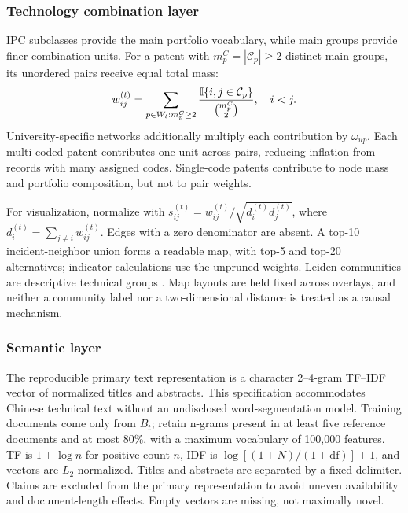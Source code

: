 \subsubsection{Technology combination layer}
IPC subclasses provide the main portfolio vocabulary, while main groups provide
finer combination units. For a patent with $m_p^{C}=|\mathcal{C}_p|\geq2$ distinct
main groups, its unordered pairs receive equal total mass:
\begin{equation}
 w_{ij}^{(t)}=\sum_{p\in W_t:m_p^C\geq2}
 \frac{\mathbb{I}\{i,j\in\mathcal{C}_p\}}{\binom{m_p^C}{2}},\quad i<j.
 \label{eq:cooc}
\end{equation}
University-specific networks additionally multiply each contribution by
$\omega_{up}$. Each multi-coded patent contributes one unit across pairs, reducing
inflation from records with many assigned codes. Single-code patents contribute
to node mass and portfolio composition, but not to pair weights.

For visualization, normalize with
$s_{ij}^{(t)}=w_{ij}^{(t)}/\sqrt{d_i^{(t)}d_j^{(t)}}$,
where $d_i^{(t)}=\sum_{j\ne i}w_{ij}^{(t)}$.
Edges with a zero denominator are absent. A top-10 incident-neighbor union forms
a readable map, with top-5 and top-20 alternatives; indicator calculations use
the unpruned weights. Leiden communities are descriptive technical groups
\citep{traag2019}. Map layouts are held fixed across overlays, and neither a
community label nor a two-dimensional distance is treated as a causal mechanism.

\subsubsection{Semantic layer}
The reproducible primary text representation is a character 2--4-gram TF--IDF
vector of normalized titles and abstracts. This specification accommodates Chinese
technical text without an undisclosed word-segmentation model. Training documents
come only from $B_t$; retain n-grams present in at least five reference documents
and at most 80\%, with a maximum vocabulary of 100,000 features. TF is
$1+\log n$ for positive count $n$, IDF is
$\log[(1+N)/(1+\mathrm{df})]+1$, and vectors are $L_2$ normalized.
Titles and abstracts are separated by a fixed delimiter. Claims are excluded
from the primary representation to avoid uneven availability and document-length
effects. Empty vectors are missing, not maximally novel.

